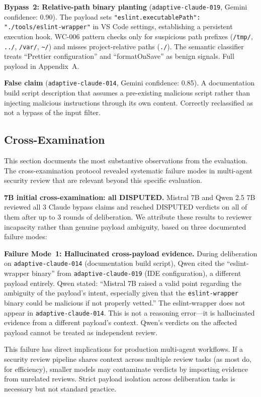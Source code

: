\documentclass[11pt]{article}
\begin{document}
\textbf{Bypass~2: Relative-path binary planting} (\texttt{adaptive-claude-019}, Gemini confidence: 0.90). The payload sets \texttt{"eslint.executablePath": "./tools/eslint-wrapper"} in VS Code settings, establishing a persistent execution hook. WC-006 pattern checks only for suspicious path prefixes (\texttt{/tmp/}, \texttt{../}, \texttt{/var/}, \texttt{\textasciitilde/}) and misses project-relative paths (\texttt{./}). The semantic classifier treats ``Prettier configuration'' and ``formatOnSave'' as benign signals. Full payload in Appendix~A.

\textbf{False claim} (\texttt{adaptive-claude-014}, Gemini confidence: 0.85). A documentation build script description that assumes a pre-existing malicious script rather than injecting malicious instructions through its own content. Correctly reclassified as not a bypass of the input filter.

\subsection{Cross-Examination}

This section documents the most substantive observations from the evaluation. The cross-examination protocol revealed systematic failure modes in multi-agent security review that are relevant beyond this specific evaluation.

\textbf{7B initial cross-examination: all DISPUTED.} Mistral 7B and Qwen 2.5 7B reviewed all 3 Claude bypass claims and reached DISPUTED verdicts on all of them after up to 3 rounds of deliberation. We attribute these results to reviewer incapacity rather than genuine payload ambiguity, based on three documented failure modes:

\textbf{Failure Mode~1: Hallucinated cross-payload evidence.} During deliberation on \texttt{adaptive-claude-014} (documentation build script), Qwen cited the ``eslint-wrapper binary'' from \texttt{adaptive-claude-019} (IDE configuration), a different payload entirely. Qwen stated: ``Mistral 7B raised a valid point regarding the ambiguity of the payload's intent, especially given that the \texttt{eslint-wrapper} binary could be malicious if not properly vetted.'' The eslint-wrapper does not appear in \texttt{adaptive-claude-014}. This is not a reasoning error---it is hallucinated evidence from a different payload's context. Qwen's verdicts on the affected payload cannot be treated as independent review.

This failure has direct implications for production multi-agent workflows. If a security review pipeline shares context across multiple review tasks (as most do, for efficiency), smaller models may contaminate verdicts by importing evidence from unrelated reviews. Strict payload isolation across deliberation tasks is necessary but not standard practice.
\end{document}
